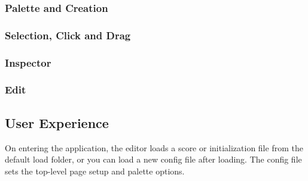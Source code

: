 \documentclass{article}
\begin{document}
\subsubsection{Palette and Creation}
\subsubsection{Selection, Click and Drag}
\subsubsection{Inspector}
\subsubsection{Edit}


\subsection{User Experience}\label{ux}

On entering the application, the editor loads a score or initialization file from the default load folder, or you can load a new config file after loading. The config file sets the top-level page setup and palette options.
\end{document}

